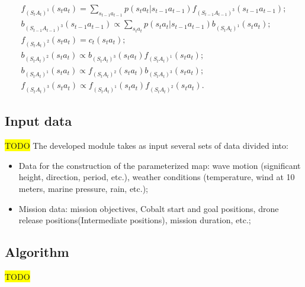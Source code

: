 \documentclass[journal,article,submit,pdftex,moreauthors]{Definitions/mdpi}
\begin{document}
\begin{equation}
	\begin{array}{l}
	f_{(S_tA_t)^1}(s_ta_t)=\sum_{s_{t-1}a_{t-1}} p(s_t a_t|s_{t-1} a_{t-1}) 
	f_{(S_{t-1}A_{t-1})^3}(s_{t-1}a_{t-1}) ;\\
	b_{(S_{t-1}A_{t-1})^3}(s_{t-1}a_{t-1})\propto \sum_{s_t a_t} p(s_t a_t|s_{t-1}a_{t-1}) b_{(S_tA_t)^1}(s_ta_t);\\
	 f_{(S_tA_t)^2}(s_ta_t)= c_t(s_ta_t);\\
	b_{(S_tA_t)^2}(s_ta_t) \propto b_{(S_tA_t)^3}(s_ta_t) f_{(S_tA_t)^1}(s_ta_t); \\
	b_{(S_tA_t)^1}(s_ta_t) \propto f_{(S_tA_t)^2}(s_ta_t) b_{(S_tA_t)^3}(s_ta_t) ;\\
	f_{(S_tA_t)^3}(s_ta_t) \propto f_{(S_tA_t)^1}(s_ta_t) f_{(S_tA_t)^2}(s_ta_t).
	\end{array}
	\label{eq:prop}
	\end{equation} 





\subsection{Input data}
\colorbox{yellow}{TODO}
The developed module takes as input several sets of data divided into:
\begin{itemize}
\item Data for the construction of the parameterized map: wave motion (significant height, direction, period, etc.), 
	weather conditions (temperature, wind at 10 meters, marine pressure, rain, etc.);
\item Mission data: mission objectives, Cobalt start and goal positions, drone release positions(Intermediate positions), 
	mission duration, etc.;
\end{itemize}

\subsection{Algorithm}
\colorbox{yellow}{TODO}



 
\end{document}
